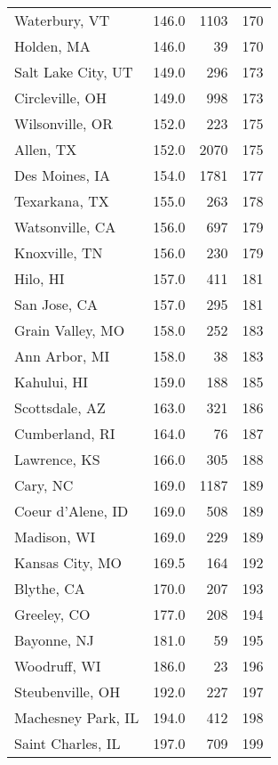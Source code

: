 \begin{longtable}{lrrr}
Waterbury, VT        &   146.0 &   1103 &   170 \\
Holden, MA           &   146.0 &     39 &   170 \\
Salt Lake City, UT   &   149.0 &    296 &   173 \\
Circleville, OH      &   149.0 &    998 &   173 \\
Wilsonville, OR      &   152.0 &    223 &   175 \\
Allen, TX            &   152.0 &   2070 &   175 \\
Des Moines, IA       &   154.0 &   1781 &   177 \\
Texarkana, TX        &   155.0 &    263 &   178 \\
Watsonville, CA      &   156.0 &    697 &   179 \\
Knoxville, TN        &   156.0 &    230 &   179 \\
Hilo, HI             &   157.0 &    411 &   181 \\
San Jose, CA         &   157.0 &    295 &   181 \\
Grain Valley, MO     &   158.0 &    252 &   183 \\
Ann Arbor, MI        &   158.0 &     38 &   183 \\
Kahului, HI          &   159.0 &    188 &   185 \\
Scottsdale, AZ       &   163.0 &    321 &   186 \\
Cumberland, RI       &   164.0 &     76 &   187 \\
Lawrence, KS         &   166.0 &    305 &   188 \\
Cary, NC             &   169.0 &   1187 &   189 \\
Coeur d'Alene, ID    &   169.0 &    508 &   189 \\
Madison, WI          &   169.0 &    229 &   189 \\
Kansas City, MO      &   169.5 &    164 &   192 \\
Blythe, CA           &   170.0 &    207 &   193 \\
Greeley, CO          &   177.0 &    208 &   194 \\
Bayonne, NJ          &   181.0 &     59 &   195 \\
Woodruff, WI         &   186.0 &     23 &   196 \\
Steubenville, OH     &   192.0 &    227 &   197 \\
Machesney Park, IL   &   194.0 &    412 &   198 \\
Saint Charles, IL    &   197.0 &    709 &   199 \\

\end{longtable}
